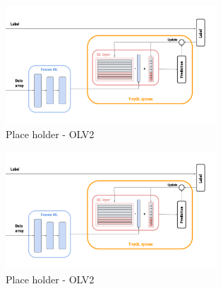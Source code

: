 \documentclass[12pt]{report}
\begin{document}
\begin{figure}[h!]
    \centering
    \includegraphics[width=0.7\textwidth]{Figures/Chapter3/OLV2.png} 
    \caption{Place holder - OLV2}
    \label{fig:block_diag_OLV2}    
\end{figure}

\begin{figure}[h!]
    \centering
    \includegraphics[width=0.7\textwidth]{Figures/Chapter3/OLV2.png} 
    \caption{Place holder - OLV2}
    \label{fig:block_diag_OLV2wb}    
\end{figure}
\end{document}
